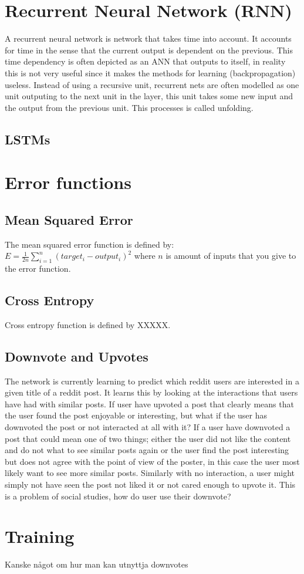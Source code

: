 \section{Recurrent Neural Network (RNN)}
A recurrent neural network is network that takes time into account. It accounts for time in the sense that the current output is dependent on the previous. This time dependency is often depicted as an ANN that outputs to itself, in reality this is not very useful since it makes the methods for learning (backpropagation) useless. Instead of using a recursive unit, recurrent nets are often modelled as one unit outputing to the next unit in the layer, this unit takes some new input and the output from the previous unit. This processes is called unfolding.%
\subsection{LSTMs}
\section{Error functions} %
\subsection{Mean Squared Error}
The mean squared error function is defined by: $E=\frac{1}{2n}\sum_{i=1}^{n} (target_i - output_i)^2$ where $n$ is amount of inputs that you give to the error function. 
\subsection{Cross Entropy}
Cross entropy function is defined by XXXXX. 

\subsection{Downvote and Upvotes} %
The network is currently learning to predict which reddit users are interested in a given title of a reddit post. It learns this by looking at the interactions that users have had with similar posts. If user have upvoted a post that clearly means that the user found the post enjoyable or interesting, but what if the user has downvoted the post or not interacted at all with it? If a user have downvoted a post that could mean one of two things; either the user did not like the content and do not what to see similar posts again or the user find the post interesting but does not agree with the point of view of the poster, in this case the user most likely want to see more similar posts. Similarly with no interaction, a user might simply not have seen the post not liked it or not cared enough to upvote it. This is a problem of social studies, how do user use their downvote?
\section{Training}
Kanske något om hur man kan utnyttja downvotes